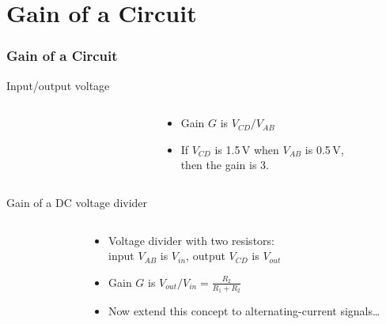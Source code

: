 \documentclass[beamer]{standalone}
\begin{document}
\section{Gain of a Circuit}
\begin{frame}[t]
 \frametitle{Gain of a Circuit}
 \begin{block}{Input/output voltage}
  \begin{columns}
   \begin{column}{0.0\textwidth}
   \end{column}
   \begin{column}{0.35\textwidth}
   \end{column}
   \begin{column}{0.65\textwidth}
    \begin{itemize}
     \item Gain $G$ is $V_{CD} / V_{AB}$
     \item If $V_{CD}$ is 1.5\,V when $V_{AB}$ is 0.5\,V, \\ then the gain is 3.
    \end{itemize}
   \end{column}
  \end{columns}
 \end{block}
 \begin{block}{Gain of a DC voltage divider}
  \begin{columns}
   \begin{column}{0.0\textwidth}
   \end{column}
   \begin{column}{0.2\textwidth}
   \end{column}
   \begin{column}{0.8\textwidth}
    \begin{itemize}
     \item Voltage divider with two resistors: \\ input $V_{AB}$ is $V_{in}$, output $V_{CD}$ is $V_{out}$
     \item Gain $G$ is $V_{out} / V_{in} = \frac{R_2}{R_1 + R_2}$
     \item Now extend this concept to alternating-current signals\ldots
    \end{itemize}
   \end{column}
  \end{columns}
 \end{block}
\end{frame}
\end{document}
